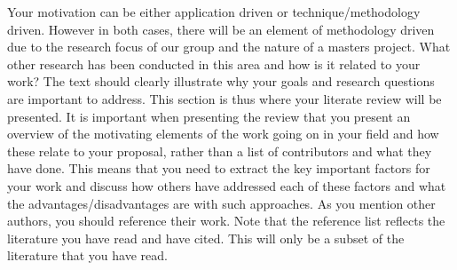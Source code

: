 Your motivation can be either application driven or technique/methodology driven. However in both cases, there will be an element of methodology driven due to the research focus of our group and the nature of a masters project.  
What other research has been conducted in this area and how is it related to your work? The text should clearly illustrate why your goals and research questions are important to address. This section is thus where your literate review will be presented. It is important when presenting the review that you present an overview of the motivating elements of the work going on in your field and how these relate to your proposal, rather than a list of contributors and what they have done. This means that you need to extract the key important factors for your work and discuss how others have addressed each of these factors and what the advantages/disadvantages are with such approaches. As you mention other authors, you should reference their work. Note that the reference list reflects the literature you have read and have cited. This will only be a subset of the literature that you have read.

